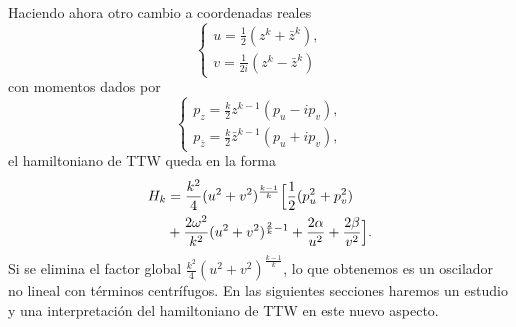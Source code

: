 \documentclass[12pt,a4paper,twocolumn,reqno]{amsart}
\theoremstyle{definition} \newtheorem{defn}[thm]{Definición}
\theoremstyle{definition} \newtheorem{ejemplo}[thm]{Ejemplo}
\theoremstyle{definition} \newtheorem{ejercicio}[thm]{Ejercicio}
\theoremstyle{remark} \newtheorem*{obs}{Observación}
\def\zz{\bar{z}}
\begin{document}
Haciendo ahora otro cambio a coordenadas reales
\begin{equation*}
  \begin{cases}
    u=\tfrac{1}{2}(z^k+\zz^k), \\
    v=\tfrac{1}{2i}(z^k-\zz^k)
  \end{cases}
\end{equation*}
con momentos dados por
\begin{equation*}
  \begin{cases}
    p_z=\tfrac{k}{2}z^{k-1}(p_u-ip_v), \\
    p_{\zz}=\tfrac{k}{2}\zz^{k-1}(p_u+ip_v),
  \end{cases}
\end{equation*}
el hamiltoniano de TTW queda en la forma
\begin{equation}
\begin{split}
  H_k&=\frac{k^2}{4}(u^2+v^2)^{\frac{k-1}{k}}\Bigl[ \frac{1}{2}(p_u^2+p_v^2) \\ &+\frac{2\omega^2}{k^2}(u^2+v^2)^{\frac{2}{k}-1}+\frac{2\alpha}{u^2}+ \frac{2\beta}{v^2}\Bigr]. 
\end{split}
\end{equation}
Si se elimina el factor global $\frac{k^2}{4}(u^2+v^2)^{\frac{k-1}{k}}$, lo que obtenemos es un oscilador no lineal con términos centrífugos. En las siguientes secciones haremos un estudio y una interpretación del hamiltoniano de TTW en este nuevo aspecto.
\end{document}

